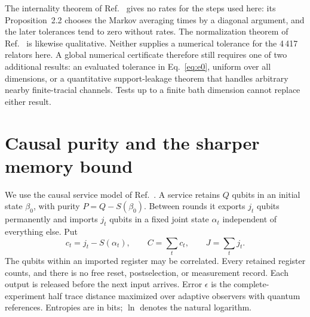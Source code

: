 The internality theorem of Ref.~\cite{alt} gives no rates for the steps used here: its Proposition~2.2
chooses the Markov averaging times by a diagonal argument, and the later tolerances tend to
zero without rates. The normalization theorem of Ref.~\cite{thom} is likewise qualitative.
Neither supplies a numerical tolerance for the 4\,417 relators here. A global numerical certificate
therefore still requires one of two additional results: an evaluated tolerance in
Eq.~\eqref{eq:e0}, uniform over all dimensions, or a quantitative support-leakage theorem
that handles arbitrary nearby finite-tracial channels. Tests up to a finite bath dimension
cannot replace either result.

\section{Causal purity and the sharper memory bound}\label{sec:causal-full}

We use the causal service model of Ref.~\cite[Definition~2.3]{causal}. A service retains $Q$ qubits in an
initial state $\beta_0$, with purity $P=Q-S(\beta_0)$. Between rounds it exports
$j_t$ qubits permanently and imports $j_t$ qubits in a fixed joint state $\alpha_t$
independent of everything else. Put
\[
 c_t=j_t-S(\alpha_t),\qquad C=\sum_tc_t,\qquad J=\sum_tj_t.
\]
The qubits within an imported register may be correlated. Every retained register counts,
and there is no free reset, postselection, or measurement record. Each output is released
before the next input arrives. Error $\epsilon$ is the complete-experiment half trace
distance maximized over adaptive observers with quantum references. Entropies are in bits;
$\ln$ denotes the natural logarithm.


